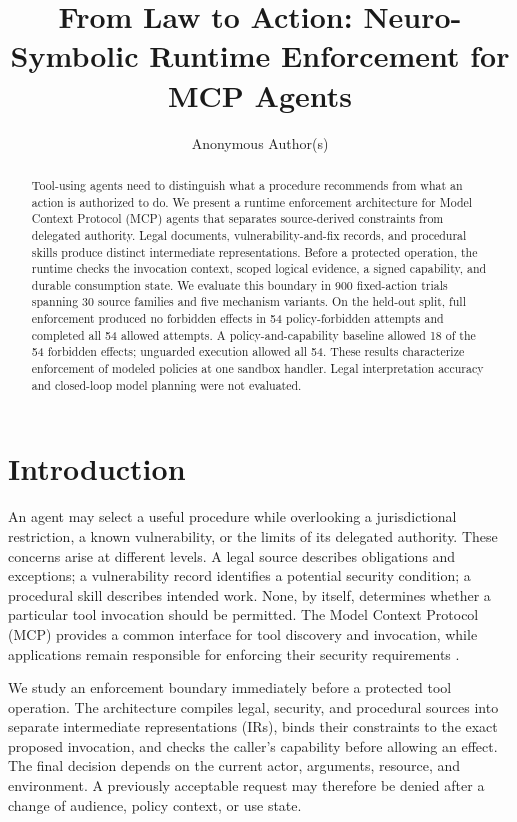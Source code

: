 \documentclass{article}
\title{From Law to Action: Neuro-Symbolic Runtime Enforcement for MCP Agents}
\author{Anonymous Author(s)}
\begin{document}
\maketitle

\begin{abstract}
Tool-using agents need to distinguish what a procedure recommends from what an action is authorized to do. We present a runtime enforcement architecture for Model Context Protocol (MCP) agents that separates source-derived constraints from delegated authority. Legal documents, vulnerability-and-fix records, and procedural skills produce distinct intermediate representations. Before a protected operation, the runtime checks the invocation context, scoped logical evidence, a signed capability, and durable consumption state. We evaluate this boundary in 900 fixed-action trials spanning 30 source families and five mechanism variants. On the held-out split, full enforcement produced no forbidden effects in 54 policy-forbidden attempts and completed all 54 allowed attempts. A policy-and-capability baseline allowed 18 of the 54 forbidden effects; unguarded execution allowed all 54. These results characterize enforcement of modeled policies at one sandbox handler. Legal interpretation accuracy and closed-loop model planning were not evaluated.
\end{abstract}

\section{Introduction}

An agent may select a useful procedure while overlooking a jurisdictional restriction, a known vulnerability, or the limits of its delegated authority. These concerns arise at different levels. A legal source describes obligations and exceptions; a vulnerability record identifies a potential security condition; a procedural skill describes intended work. None, by itself, determines whether a particular tool invocation should be permitted. The Model Context Protocol (MCP) provides a common interface for tool discovery and invocation, while applications remain responsible for enforcing their security requirements \citep{mcp,mcp-auth}.

We study an enforcement boundary immediately before a protected tool operation. The architecture compiles legal, security, and procedural sources into separate intermediate representations (IRs), binds their constraints to the exact proposed invocation, and checks the caller's capability before allowing an effect. The final decision depends on the current actor, arguments, resource, and environment. A previously acceptable request may therefore be denied after a change of audience, policy context, or use state.
\end{document}
